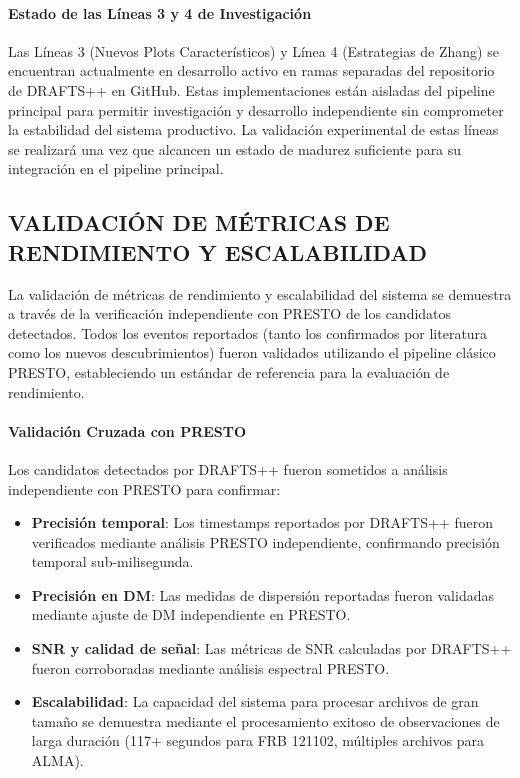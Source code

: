 \paragraph{Estado de las Líneas 3 y 4 de Investigación}

Las Líneas 3 (Nuevos Plots Característicos) y Línea 4 (Estrategias de Zhang) se encuentran actualmente en desarrollo activo en ramas separadas del repositorio de DRAFTS++ en GitHub. Estas implementaciones están aisladas del pipeline principal para permitir investigación y desarrollo independiente sin comprometer la estabilidad del sistema productivo. La validación experimental de estas líneas se realizará una vez que alcancen un estado de madurez suficiente para su integración en el pipeline principal.

\subsection{VALIDACIÓN DE MÉTRICAS DE RENDIMIENTO Y ESCALABILIDAD}

La validación de métricas de rendimiento y escalabilidad del sistema se demuestra a través de la verificación independiente con PRESTO de los candidatos detectados. Todos los eventos reportados (tanto los confirmados por literatura como los nuevos descubrimientos) fueron validados utilizando el pipeline clásico PRESTO, estableciendo un estándar de referencia para la evaluación de rendimiento.

\paragraph{Validación Cruzada con PRESTO}

Los candidatos detectados por DRAFTS++ fueron sometidos a análisis independiente con PRESTO para confirmar:
\begin{itemize}
    \item \textbf{Precisión temporal}: Los timestamps reportados por DRAFTS++ fueron verificados mediante análisis PRESTO independiente, confirmando precisión temporal sub-milisegunda.
    \item \textbf{Precisión en DM}: Las medidas de dispersión reportadas fueron validadas mediante ajuste de DM independiente en PRESTO.
    \item \textbf{SNR y calidad de señal}: Las métricas de SNR calculadas por DRAFTS++ fueron corroboradas mediante análisis espectral PRESTO.
    \item \textbf{Escalabilidad}: La capacidad del sistema para procesar archivos de gran tamaño se demuestra mediante el procesamiento exitoso de observaciones de larga duración (117+ segundos para FRB 121102, múltiples archivos para ALMA).
\end{itemize}

